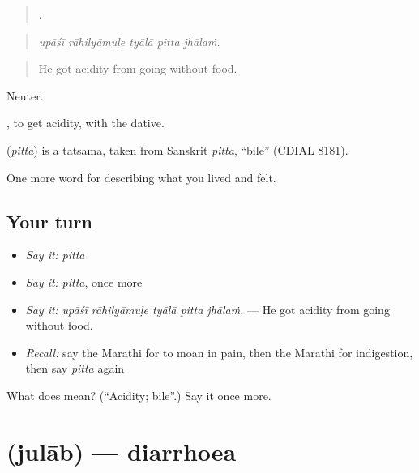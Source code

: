 \begin{quote}
    .
\end{quote}

\begin{quote}
\emph{upāśī rāhilyāmuḷe tyālā pitta jhālaṁ.}
\end{quote}

\begin{quote}
He got acidity from going without food.
\end{quote}

Neuter.

 , to get acidity, with the dative.

\begin{cousinweb}
\textbf{} (\emph{pitta}) is a tatsama, taken from Sanskrit \emph{pitta}, \textquotedblleft{}bile\textquotedblright{} (CDIAL 8181).
\end{cousinweb}

\begin{grammarlens}[title={What you've built}]
One more word for describing what you lived and felt.
\end{grammarlens}

\subsection*{Your turn}
\begin{itemize}
\raggedright
  \item \emph{Say it:} \emph{pitta}
  \item \emph{Say it:} \emph{pitta}, once more
  \item \emph{Say it:} \emph{upāśī rāhilyāmuḷe tyālā pitta jhālaṁ.} — He got acidity from going without food.
  \item \emph{Recall:} say the Marathi for to moan in pain, then the Marathi for indigestion, then say \emph{pitta} again
\end{itemize}

\begin{tcolorbox}[breakable,colback=teal!4,colframe=teal!35!black,title={Before you move on}]
What does  mean? (\textquotedblleft{}Acidity; bile\textquotedblright{}.) Say it once more.
\end{tcolorbox}
\section[\texorpdfstring{\mr{जुलाब} (julāb)}{जुलाब (julāb)}]{ (julāb) — diarrhoea}

